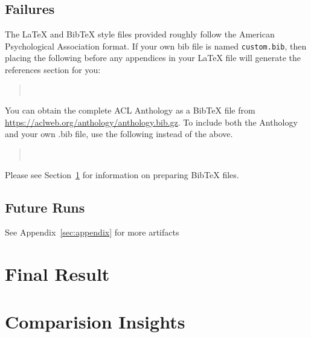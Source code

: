 \documentclass[9pt]{article}
\begin{document}
\subsection{Failures}

\nocite{Ando2005,borschinger-johnson-2011-particle,andrew2007scalable,rasooli-tetrault-2015,goodman-etal-2016-noise,harper-2014-learning}

The \LaTeX{} and Bib\TeX{} style files provided roughly follow the American Psychological Association format.
If your own bib file is named \texttt{custom.bib}, then placing the following before any appendices in your \LaTeX{} file will generate the references section for you:
\begin{quote}
\begin{verbatim}


\end{verbatim}
\end{quote}

You can obtain the complete ACL Anthology as a Bib\TeX{} file from \url{https://aclweb.org/anthology/anthology.bib.gz}.
To include both the Anthology and your own .bib file, use the following instead of the above.
\begin{quote}
\begin{verbatim}


\end{verbatim}
\end{quote}

Please see Section~\ref{sec:bibtex} for information on preparing Bib\TeX{} files.

\subsection{Future Runs}

See Appendix~\ref{sec:appendix} for more artifacts

\section{Final Result}
\label{sec:bibtex}


\section{Comparision Insights}
\end{document}
